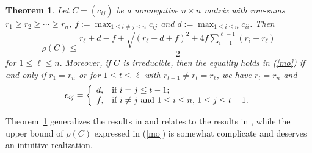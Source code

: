 \documentclass[final,3p, times, 12pt]{elsarticle}
\theoremstyle{plain}
\newtheorem{thm}{Theorem}[section]
\theoremstyle{definition}
\theoremstyle{remark}
\numberwithin{equation}{section}
\begin{document}
\begin{thm}\label{dz2013}
Let $C=(c_{ij})$ be a nonnegative $n\times n$ matrix with  row-sums $r_1\geq r_2\geq \cdots \geq r_n$,  $f:=\max_{1\leq i\not=j\leq n} c_{ij}$ and $d:=\max_{1\leq i\leq n} c_{ii}$. Then
\begin{equation}\label{mo}\rho(C) \leq \frac{r_{\ell}+d-f+\sqrt{(r_{\ell}-d+f)^{2}+4f\sum_{i=1}^{\ell-1}(r_i-r_\ell)}}{2}\end{equation}
for $1 \leq \ell \leq n.$
Moreover, if $C$ is irreducible, then the equality holds in (\ref{mo}) if and only if $r_1=r_n$ or for  $1\leq t\leq \ell$ with $r_{t-1}\not=r_t=r_\ell$, we have $r_t=r_n$ and
$$c_{ij}=\left\{
           \begin{array}{ll}
             d, & \hbox{if $i=j\leq t-1$;} \\
             f, & \hbox{if $i\not=j$ and $1\leq i\leq n$, $1\leq j\leq t-1.$}
           \end{array}
         \right.$$
\end{thm}


Theorem~\ref{dz2013} generalizes the results in \cite{bh:85, cls:13, h:98, hsf:01, lw13, s87, sw:04} and
relates to the  results in \cite{hw:13, Liu, s87}, while the upper bound of $\rho(C)$ expressed in (\ref{mo}) is somewhat complicate and deserves an intuitive realization.
\end{document}
